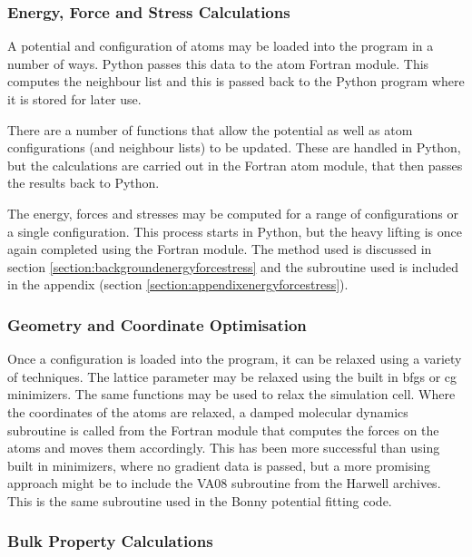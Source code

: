 \subsubsection{Energy, Force and Stress Calculations}

A potential and configuration of atoms may be loaded into the program in a number of ways.  Python passes this data to the atom Fortran module.  This computes the neighbour list and this is passed back to the Python program where it is stored for later use.

There are a number of functions that allow the potential as well as atom configurations (and neighbour lists) to be updated.  These are handled in Python, but the calculations are carried out in the Fortran atom module, that then passes the results back to Python.

The energy, forces and stresses may be computed for a range of configurations or a single configuration.  This process starts in Python, but the heavy lifting is once again completed using the Fortran module.  The method used is discussed in section \ref{section:backgroundenergyforcestress} and the subroutine used is included in the appendix (section \ref{section:appendixenergyforcestress}).


\subsubsection{Geometry and Coordinate Optimisation}

Once a configuration is loaded into the program, it can be relaxed using a variety of techniques.  The lattice parameter may be relaxed using the built in \acrshort{bfgs} or \acrshort{cg} minimizers.  The same functions may be used to relax the simulation cell.  Where the coordinates of the atoms are relaxed, a damped molecular dynamics subroutine is called from the Fortran module that computes the forces on the atoms and moves them accordingly.  This has been more successful than using built in minimizers, where no gradient data is passed, but a more promising approach might be to include the VA08 subroutine from the Harwell archives\cite{harwellva08}.  This is the same subroutine used in the Bonny potential fitting code\cite{bonnyfecr}.



\subsubsection{Bulk Property Calculations}

